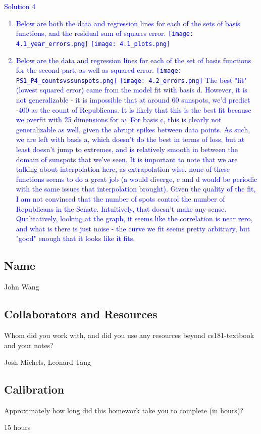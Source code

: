 \documentclass[submit]{harvardml}
\begin{document}
\newpage
\textcolor{blue}{
\begin{framed}
Solution 4
\begin{enumerate}
    \item Below are both the data and regression lines for each of the sets of basis functions, and the residual sum of squares error. \newline
    \texttt{[image: 4.1\_year\_errors.png]} \newline
    \texttt{[image: 4.1\_plots.png]} \newline
    \item Below are the data and regression lines for each of the set of basis functions for the second part, as well as squared error. 
    \newline
    \texttt{[image: PS1\_P4\_countsvssunspots.png]}
    \texttt{[image: 4.2\_errors.png]}
    \newline
    The best "fit" (lowest squared error) came from the model fit with basis d. However, it is not generalizable - it is impossible that at around 60 sunspots, we'd predict -400 as the count of Republicans. It is likely that this is the best fit because we overfit with 25 dimensions for $w$. For basis c, this is clearly not generalizable as well, given the abrupt spikes between data points. As such, we are left with basis a, which doesn't do the best in terms of loss, but at least doesn't jump to extremes, and is relatively smooth in between the domain of sunspots that we've seen. \newline  It is important to note that we are talking about interpolation here, as extrapolation wise, none of these functions seems to do a great job (a would diverge, c and d would be periodic with the same issues that interpolation brought). Given the quality of the fit, I am not convinced that the number of spots control the number of Republicans in the Senate. Intuitively, that doesn't make any sense. Qualitatively, looking at the graph, it seems like the correlation is near zero, and what is there is just noise - the curve we fit seems pretty arbitrary, but "good" enough that it looks like it fits.
\end{enumerate}
\end{framed}
}


\newpage
\subsection*{Name}

John Wang 

\subsection*{Collaborators and Resources}
Whom did you work with, and did you use any resources beyond cs181-textbook and your notes?

Josh Michels, Leonard Tang

\subsection*{Calibration}
Approximately how long did this homework take you to complete (in hours)? 

15 hours
\end{document}
